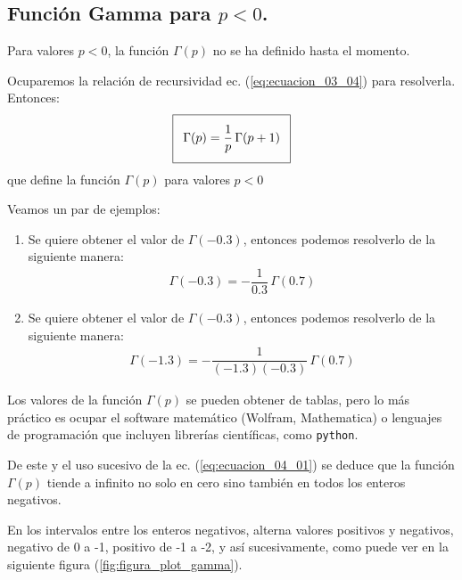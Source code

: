 \subsection{Función Gamma para \texorpdfstring{$p < 0$}{p < 0}.}

Para valores $p < 0$, la función $\Gamma (p)$ no se ha definido hasta el momento.
\par
Ocuparemos la relación de recursividad ec. (\ref{eq:ecuacion_03_04}) para resolverla. Entonces:
\begin{align}\addtolength{\fboxsep}{5pt}\boxed{
\Gamma (p) = \dfrac{1}{p} \, \Gamma (p + 1)}
\label{eq:ecuacion_04_01}
\end{align}
que define la función $\Gamma (p)$ para valores $p < 0$
\par
Veamos un par de ejemplos: 
\begin{enumerate}
\item  Se quiere obtener el valor de $\Gamma (-0.3)$, entonces podemos resolverlo de la siguiente manera:
\begin{align*}
\Gamma (-0.3) = - \dfrac{1}{0.3} \, \Gamma (0.7)
\end{align*}
\item  Se quiere obtener el valor de $\Gamma (-0.3)$, entonces podemos resolverlo de la siguiente manera:
\begin{align*}
\Gamma (-1.3) = - \dfrac{1}{(-1.3)(-0.3)} \, \Gamma (0.7)
\end{align*}
\end{enumerate}
Los valores de la función $\Gamma (p)$ se pueden obtener de tablas, pero lo más práctico es ocupar el software matemático (Wolfram, Mathematica) o lenguajes de programación que incluyen librerías científicas, como \texttt{python}.
\par
De este y el uso sucesivo de la ec. (\ref{eq:ecuacion_04_01}) se deduce que la función $\Gamma (p)$ tiende a infinito no solo en cero sino también en todos los enteros negativos.
\par
En los intervalos entre los enteros negativos, alterna valores positivos y negativos, negativo de 0 a -1, positivo de -1 a -2, y así sucesivamente, como puede ver en la siguiente figura (\ref{fig:figura_plot_gamma}).
